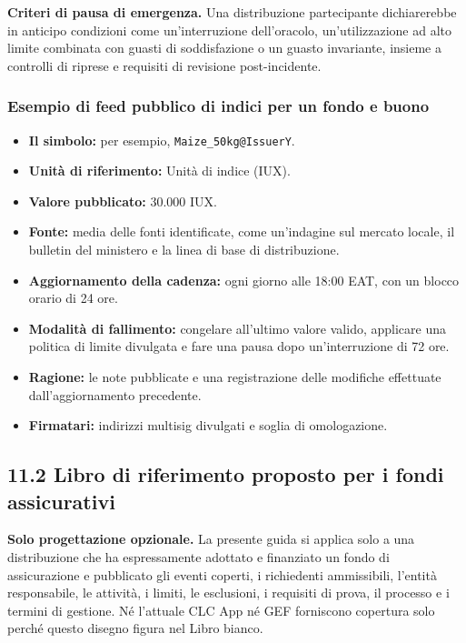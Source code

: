 \documentclass[11pt]{article}
\begin{document}
\textbf{Criteri di pausa di emergenza.} Una distribuzione partecipante dichiarerebbe in anticipo condizioni come un'interruzione dell'oracolo, un'utilizzazione ad alto limite combinata con guasti di soddisfazione o un guasto invariante, insieme a controlli di riprese e requisiti di revisione post-incidente.

\subsubsection*{Esempio di feed pubblico di indici per un fondo e buono}

\begin{itemize}[leftmargin=*]
\item \textbf{Il simbolo:} per esempio, \texttt{Maize\_50kg@IssuerY}.
\item \textbf{Unità di riferimento:} Unità di indice (IUX).
\item \textbf{Valore pubblicato:} 30.000 IUX.
\item \textbf{Fonte:} media delle fonti identificate, come un'indagine sul mercato locale, il bulletin del ministero e la linea di base di distribuzione.
\item \textbf{Aggiornamento della cadenza:} ogni giorno alle 18:00 EAT, con un blocco orario di 24 ore.
\item \textbf{Modalità di fallimento:} congelare all'ultimo valore valido, applicare una politica di limite divulgata e fare una pausa dopo un'interruzione di 72 ore.
\item \textbf{Ragione:} le note pubblicate e una registrazione delle modifiche effettuate dall'aggiornamento precedente.
\item \textbf{Firmatari:} indirizzi multisig divulgati e soglia di omologazione.
\end{itemize}
\subsection*{11.2 Libro di riferimento proposto per i fondi assicurativi}

\textbf{Solo progettazione opzionale.} La presente guida si applica solo a una distribuzione che ha espressamente adottato e finanziato un fondo di assicurazione e pubblicato gli eventi coperti, i richiedenti ammissibili, l'entità responsabile, le attività, i limiti, le esclusioni, i requisiti di prova, il processo e i termini di gestione. Né l'attuale CLC App né GEF forniscono copertura solo perché questo disegno figura nel Libro bianco.
\end{document}
